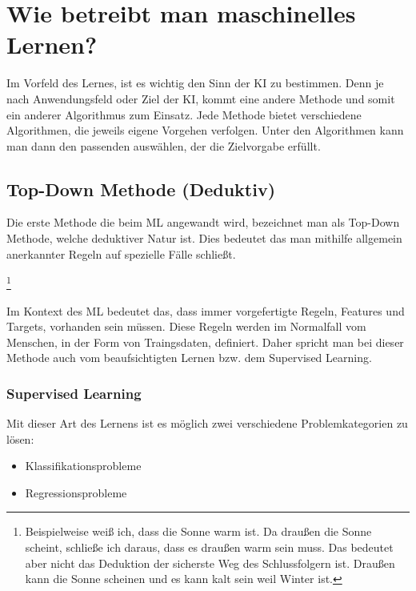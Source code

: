 \documentclass[12pt,german,ngerman]{report}
\begin{document}
    \section{Wie betreibt man maschinelles Lernen?}
        Im Vorfeld des Lernes, ist es wichtig den Sinn der KI zu bestimmen.
        Denn je nach Anwendungsfeld oder Ziel der KI, kommt eine andere Methode und somit
        ein anderer Algorithmus zum Einsatz. Jede Methode bietet verschiedene Algorithmen,
        die jeweils eigene Vorgehen verfolgen. Unter den Algorithmen kann man
        dann den passenden auswählen, der die Zielvorgabe erfüllt.

    \subsection{Top-Down Methode (Deduktiv)}
        Die erste Methode die beim ML angewandt wird, bezeichnet man als Top-Down Methode,
        welche deduktiver Natur ist. Dies bedeutet das man mithilfe  allgemein anerkannter Regeln
        auf spezielle Fälle schließt.\cite{dundi2021unileipzig} 

        \footnote{Beispielweise weiß ich, dass die Sonne warm ist. Da draußen die Sonne scheint, schließe ich daraus,
        dass es draußen warm sein muss. Das bedeutet aber nicht das Deduktion der sicherste Weg des 
        Schlussfolgern ist. Draußen kann die Sonne scheinen und es kann kalt sein weil Winter ist.}

        Im Kontext des ML bedeutet das, dass immer vorgefertigte Regeln, Features und Targets, vorhanden sein müssen.
        Diese Regeln werden im Normalfall vom Menschen, in der Form von Traingsdaten, definiert. Daher spricht man bei dieser Methode
        auch vom beaufsichtigten Lernen bzw. dem Supervised Learning.

        \subsubsection{Supervised Learning}
            Mit dieser Art des Lernens ist es möglich zwei verschiedene 
            Problemkategorien zu lösen:\cite{supervisedlearning2021ibm}

            \begin{itemize}
                \item{Klassifikationsprobleme}
                \item{Regressionsprobleme}
            \end{itemize}
\end{document}
